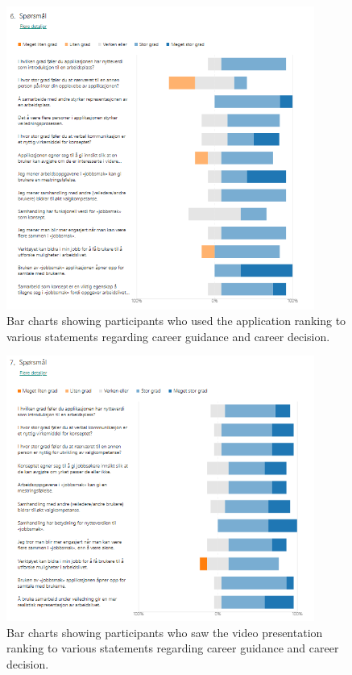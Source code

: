 \begin{figure}[H]
  \centering
   \captionsetup{width=.8\linewidth}
    \includegraphics[width=0.9\textwidth]{fig/phase_3/survey/valgKompentanseApp.PNG}
 \caption{Bar charts showing participants who used the application ranking to various statements regarding career guidance and career decision.}
\label{fig:phase3_SurveyValgkompApp}
\end{figure}


\begin{figure}[H]
  \centering
   \captionsetup{width=.8\linewidth}
    \includegraphics[width=0.9\textwidth]{fig/phase_3/survey/valgKompentanseVideoPNG.PNG}
 \caption{Bar charts showing participants who saw the video presentation ranking to various statements regarding career guidance and career decision.}
\label{fig:phase3_SurveyValgkompVideo}
\end{figure}






